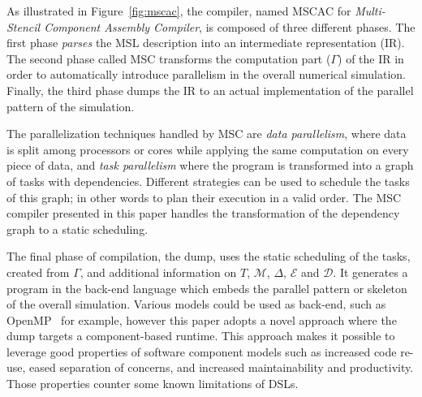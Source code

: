 As illustrated in Figure~\ref{fig:mscac}, the compiler, named MSCAC for \emph{Multi-Stencil Component Assembly Compiler}, is composed of three different phases. The first phase \emph{parses} the MSL description into an intermediate representation (IR). The second phase called MSC transforms the computation part ($\Gamma$) of the IR in order to automatically introduce parallelism in the overall numerical simulation.
Finally, the third phase dumps the IR to an actual implementation of the parallel pattern of the simulation.


The parallelization techniques handled by MSC are \emph{data parallelism}, where data is split among processors or cores while applying the same computation on every piece of data, and \emph{task parallelism} where the program is transformed into a graph of tasks with dependencies.
Different strategies can be used to schedule the tasks of this graph; in other words to plan their execution in a valid order. The MSC compiler presented in this paper handles the transformation of the dependency graph to a static scheduling.

The final phase of compilation, the dump, uses the static scheduling of the tasks, created from $\Gamma$, and additional information on $T$, $\mathcal{M}$, $\Delta$, $\mathcal{E}$ and $\mathcal{D}$.
It generates a program in the back-end language which embeds the parallel pattern or skeleton of the overall simulation.
Various models could be used as back-end, such as OpenMP~\cite{660313} for example, however this paper adopts a novel approach where the dump targets a component-based runtime.
This approach makes it possible to leverage good properties of software component models such as increased code re-use, eased separation of concerns, and increased maintainability and productivity.
Those properties counter some known limitations of DSLs. %

